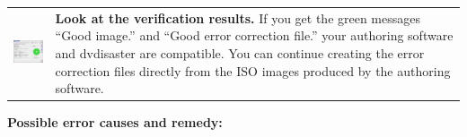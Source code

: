 \begin{tabular}{ccl}
  \multicolumn{2}{c}{
  \begin{minipage}{50mm}
    \centerline{\includegraphics[width=40mm]{screenshots/info-okay-rs01.png}}
  \end{minipage}}
  &
  \begin{minipage}{100mm}
    {\bf Look at the verification results.} If you get the green messages ``Good image.'' 
    and ``Good error correction file.'' your authoring software and dvdisaster 
    are compatible. You can continue creating the error correction files directly 
    from the ISO images produced by the authoring software. 
  \end{minipage}\\
\end{tabular}
\newpage

{\bf Possible error causes and remedy:}

\bigskip

